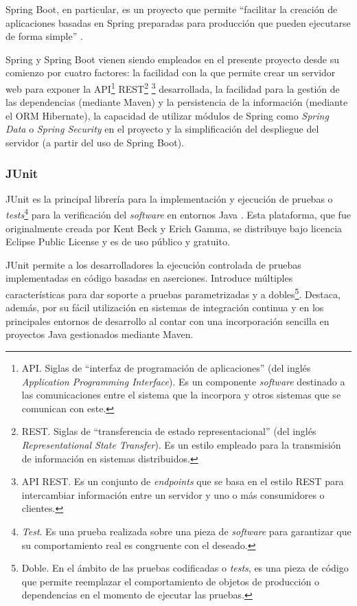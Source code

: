 Spring Boot, en particular, es un proyecto que permite ``facilitar la creación de aplicaciones basadas en Spring preparadas para producción que pueden ejecutarse de forma simple'' \cite{Tec_SpringBoot}.

Spring y Spring Boot vienen siendo empleados en el presente proyecto desde su comienzo por cuatro factores: la facilidad con la que permite crear un servidor web para exponer la API\footnote{API. Siglas de ``interfaz de programación de aplicaciones'' (del inglés \textit{Application Programming Interface}). Es un componente \textit{software} destinado a las comunicaciones entre el sistema que la incorpora y otros sistemas que se comunican con este.} REST\footnote{REST. Siglas de ``transferencia de estado representacional'' (del inglés \textit{Representational State Transfer}). Es un estilo empleado para la transmisión de información en sistemas distribuidos.} \footnote{API REST. Es un conjunto de \textit{endpoints} que se basa en el estilo REST para intercambiar información entre un servidor y uno o más consumidores o clientes.} desarrollada, la facilidad para la gestión de las dependencias (mediante Maven) y la persistencia de la información (mediante el ORM Hibernate), la capacidad de utilizar módulos de Spring como \textit{Spring Data} o \textit{Spring Security} en el proyecto y la simplificación del despliegue del servidor (a partir del uso de Spring Boot).

\subsubsection{JUnit}
JUnit es la principal librería para la implementación y ejecución de pruebas o \textit{tests}\footnote{\textit{Test}. Es una prueba realizada sobre una pieza de \textit{software} para garantizar que su comportamiento real es congruente con el deseado.} para la verificación del \textit{software} en entornos Java \cite{Tec_JUnit}.
Esta plataforma, que fue originalmente creada por Kent Beck y Erich Gamma, se distribuye bajo licencia Eclipse Public License y es de uso público y gratuito.

JUnit permite a los desarrolladores la ejecución controlada de pruebas implementadas en código basadas en aserciones. Introduce múltiples características para dar soporte a pruebas parametrizadas y a dobles\footnote{Doble. En el ámbito de las pruebas codificadas o \textit{tests}, es una pieza de código que permite reemplazar el comportamiento de objetos de producción o dependencias en el momento de ejecutar las pruebas.}. Destaca, además, por su fácil utilización en sistemas de integración continua y en los principales entornos de desarrollo al contar con una incorporación sencilla en proyectos Java gestionados mediante Maven.

